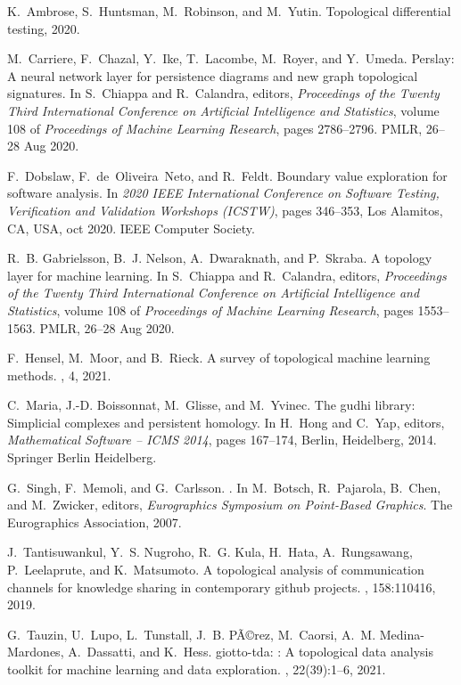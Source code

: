 \documentclass[11pt, oneside]{article}
\begin{document}

\begin{thebibliography}{1}

K.~Ambrose, S.~Huntsman, M.~Robinson, and M.~Yutin.
\newblock Topological differential testing, 2020.

M.~Carriere, F.~Chazal, Y.~Ike, T.~Lacombe, M.~Royer, and Y.~Umeda.
\newblock Perslay: A neural network layer for persistence diagrams and new
  graph topological signatures.
\newblock In S.~Chiappa and R.~Calandra, editors, {\em Proceedings of the
  Twenty Third International Conference on Artificial Intelligence and
  Statistics}, volume 108 of {\em Proceedings of Machine Learning Research},
  pages 2786--2796. PMLR, 26--28 Aug 2020.

F.~Dobslaw, F.~de~Oliveira~Neto, and R.~Feldt.
\newblock Boundary value exploration for software analysis.
\newblock In {\em 2020 IEEE International Conference on Software Testing,
  Verification and Validation Workshops (ICSTW)}, pages 346--353, Los Alamitos,
  CA, USA, oct 2020. IEEE Computer Society.

R.~B. Gabrielsson, B.~J. Nelson, A.~Dwaraknath, and P.~Skraba.
\newblock A topology layer for machine learning.
\newblock In S.~Chiappa and R.~Calandra, editors, {\em Proceedings of the
  Twenty Third International Conference on Artificial Intelligence and
  Statistics}, volume 108 of {\em Proceedings of Machine Learning Research},
  pages 1553--1563. PMLR, 26--28 Aug 2020.

F.~Hensel, M.~Moor, and B.~Rieck.
\newblock A survey of topological machine learning methods.
, 4, 2021.

C.~Maria, J.-D. Boissonnat, M.~Glisse, and M.~Yvinec.
\newblock The gudhi library: Simplicial complexes and persistent homology.
\newblock In H.~Hong and C.~Yap, editors, {\em Mathematical Software -- ICMS
  2014}, pages 167--174, Berlin, Heidelberg, 2014. Springer Berlin Heidelberg.

G.~Singh, F.~Memoli, and G.~Carlsson.
.
\newblock In M.~Botsch, R.~Pajarola, B.~Chen, and M.~Zwicker, editors, {\em
  Eurographics Symposium on Point-Based Graphics}. The Eurographics
  Association, 2007.

J.~Tantisuwankul, Y.~S. Nugroho, R.~G. Kula, H.~Hata, A.~Rungsawang,
  P.~Leelaprute, and K.~Matsumoto.
\newblock A topological analysis of communication channels for knowledge
  sharing in contemporary github projects.
, 158:110416, 2019.

G.~Tauzin, U.~Lupo, L.~Tunstall, J.~B. PÃ©rez, M.~Caorsi, A.~M.
  Medina-Mardones, A.~Dassatti, and K.~Hess.
\newblock giotto-tda: : A topological data analysis toolkit for machine
  learning and data exploration.
, 22(39):1--6, 2021.

\end{thebibliography}
\end{document}
